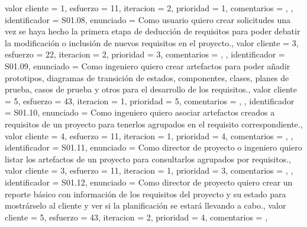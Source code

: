 \documentclass[a4paper, 12pt, spanish]{memoria}
\begin{document}
{{    valor cliente = 1,
    esfuerzo      = {1}{1},
    iteracion     = 2,
    prioridad     = 1,
    comentarios   = {},
},{%
    identificador = S01.08,
    enunciado     = {Como usuario quiero crear solicitudes una vez se haya hecho la primera etapa de deducción de requisitos para poder debatir la modificación o inclusión de nuevos requisitos en el proyecto.},
    valor cliente = 3,
    esfuerzo      = {2}{2},
    iteracion     = 2,
    prioridad     = 3,
    comentarios   = {},
},{%
    identificador = S01.09,
    enunciado     = {Como ingeniero quiero crear artefactos para poder añadir prototipos, diagramas de transición de estados, componentes, clases, planes de prueba, casos de prueba y otros para el desarrollo de los requisitos.},
    valor cliente = 5,
    esfuerzo      = {4}{3},
    iteracion     = 1,
    prioridad     = 5,
    comentarios   = {},
},{%
    identificador = S01.10,
    enunciado     = {Como ingeniero quiero asociar artefactos creados a requisitos de un proyecto para tenerlos agrupados en el requisito correspondiente.},
    valor cliente = 4,
    esfuerzo      = {1}{1},
    iteracion     = 1,
    prioridad     = 4,
    comentarios   = {},
},{%
    identificador = S01.11,
    enunciado     = {Como director de proyecto o ingeniero quiero listar los artefactos de un proyecto para consultarlos agrupados por requisitos.},
    valor cliente = 3,
    esfuerzo      = {1}{1},
    iteracion     = 1,
    prioridad     = 3,
    comentarios   = {},
},{%
    identificador = S01.12,
    enunciado     = {Como director de proyecto quiero crear un reporte básico con información de los requisitos del proyecto y su estado para mostrárselo al cliente y ver si la planificación se estará llevando a cabo.},
    valor cliente = 5,
    esfuerzo      = {4}{3},
    iteracion     = 2,
    prioridad     = 4,
    comentarios   = {},
}} %

\end{document}
